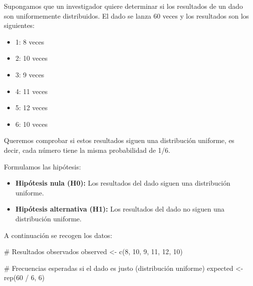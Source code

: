 \documentclass[
  letterpaper,
  DIV=11,
  numbers=noendperiod]{scrreprt}
\newenvironment{Shaded}{\begin{snugshade}}{\end{snugshade}}
\newcommand{\CommentTok}[1]{\textcolor[rgb]{0.37,0.37,0.37}{#1}}
\newcommand{\DecValTok}[1]{\textcolor[rgb]{0.68,0.00,0.00}{#1}}
\newcommand{\FunctionTok}[1]{\textcolor[rgb]{0.28,0.35,0.67}{#1}}
\newcommand{\NormalTok}[1]{\textcolor[rgb]{0.00,0.23,0.31}{#1}}
\newcommand{\OtherTok}[1]{\textcolor[rgb]{0.00,0.23,0.31}{#1}}
\newcommand{\SpecialCharTok}[1]{\textcolor[rgb]{0.37,0.37,0.37}{#1}}
\providecommand{\tightlist}{%
  \setlength{\itemsep}{0pt}\setlength{\parskip}{0pt}}\usepackage{longtable,booktabs,array}
\begin{document}
\begin{tcolorbox}[enhanced jigsaw, arc=.35mm, breakable, coltitle=black, left=2mm, opacityback=0, bottomtitle=1mm, colbacktitle=quarto-callout-tip-color!10!white, title=\textcolor{quarto-callout-tip-color}{\faLightbulb}\hspace{0.5em}{Ejemplo Práctico. Prueba Chi-cuadrado de bondad de ajuste}, titlerule=0mm, colback=white, colframe=quarto-callout-tip-color-frame, bottomrule=.15mm, rightrule=.15mm, opacitybacktitle=0.6, toptitle=1mm, toprule=.15mm, leftrule=.75mm]

Supongamos que un investigador quiere determinar si los resultados de un
dado son uniformemente distribuidos. El dado se lanza \(60\) veces y los
resultados son los siguientes:

\begin{itemize}
\tightlist
\item
  1: 8 veces
\item
  2: 10 veces
\item
  3: 9 veces
\item
  4: 11 veces
\item
  5: 12 veces
\item
  6: 10 veces
\end{itemize}

Queremos comprobar si estos resultados siguen una distribución uniforme,
es decir, cada número tiene la misma probabilidad de 1/6.

Formulamos las hipótesis:

\begin{itemize}
\tightlist
\item
  \textbf{Hipótesis nula (H0):} Los resultados del dado siguen una
  distribución uniforme.
\item
  \textbf{Hipótesis alternativa (H1):} Los resultados del dado no siguen
  una distribución uniforme.
\end{itemize}

A continuación se recogen los datos:

\begin{Shaded}
\begin{Highlighting}[]
\CommentTok{\# Resultados observados}
\NormalTok{observed }\OtherTok{\textless{}{-}} \FunctionTok{c}\NormalTok{(}\DecValTok{8}\NormalTok{, }\DecValTok{10}\NormalTok{, }\DecValTok{9}\NormalTok{, }\DecValTok{11}\NormalTok{, }\DecValTok{12}\NormalTok{, }\DecValTok{10}\NormalTok{)}

\CommentTok{\# Frecuencias esperadas si el dado es justo (distribución uniforme)}
\NormalTok{expected }\OtherTok{\textless{}{-}} \FunctionTok{rep}\NormalTok{(}\DecValTok{60} \SpecialCharTok{/} \DecValTok{6}\NormalTok{, }\DecValTok{6}\NormalTok{)}
\end{Highlighting}
\end{Shaded}


\end{tcolorbox}
\end{document}
